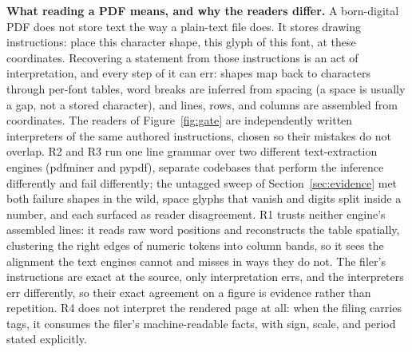 \documentclass[11pt]{article}
\newcommand{\lead}[2]{\par\addvspace{5pt}\textbf{\textcolor{#1}{#2}}}
\begin{document}
\lead{navytwo}{What reading a PDF means, and why the readers differ.} A born-digital PDF does not store text the way a plain-text file does. It stores drawing instructions: place this character shape, this glyph of this font, at these coordinates. Recovering a statement from those instructions is an act of interpretation, and every step of it can err: shapes map back to characters through per-font tables, word breaks are inferred from spacing (a space is usually a gap, not a stored character), and lines, rows, and columns are assembled from coordinates. The readers of Figure~\ref{fig:gate} are independently written interpreters of the same authored instructions, chosen so their mistakes do not overlap. R2 and R3 run one line grammar over two different text-extraction engines (pdfminer and pypdf), separate codebases that perform the inference differently and fail differently; the untagged sweep of Section~\ref{sec:evidence} met both failure shapes in the wild, space glyphs that vanish and digits split inside a number, and each surfaced as reader disagreement. R1 trusts neither engine's assembled lines: it reads raw word positions and reconstructs the table spatially, clustering the right edges of numeric tokens into column bands, so it sees the alignment the text engines cannot and misses in ways they do not. The filer's instructions are exact at the source, only interpretation errs, and the interpreters err differently, so their exact agreement on a figure is evidence rather than repetition. R4 does not interpret the rendered page at all: when the filing carries tags, it consumes the filer's machine-readable facts, with sign, scale, and period stated explicitly.
\end{document}
